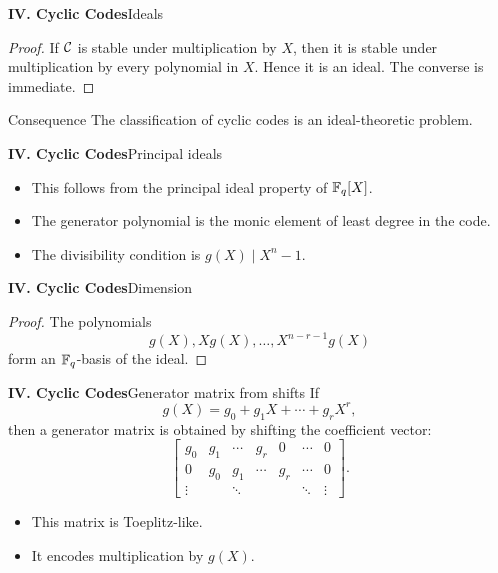 \begin{frame}{\textbf{IV. Cyclic Codes}}{Ideals}
\small
{}
\begin{proof}
If $\mathcal{C}$ is stable under multiplication by $X$, then it is stable under multiplication by every polynomial in $X$. Hence it is an ideal. The converse is immediate.
\end{proof}
\begin{block}{Consequence}
The classification of cyclic codes is an ideal-theoretic problem.
\end{block}
\end{frame}

\begin{frame}{\textbf{IV. Cyclic Codes}}{Principal ideals}
\small
{}
\begin{itemize}
  \item This follows from the principal ideal property of $\mathbb{F}_q[X]$.
  \item The generator polynomial is the monic element of least degree in the code.
  \item The divisibility condition is $g(X)\mid X^n-1$.
\end{itemize}
\end{frame}

\begin{frame}{\textbf{IV. Cyclic Codes}}{Dimension}
\small
{}
\begin{proof}
The polynomials
\[
  g(X),Xg(X),\ldots,X^{n-r-1}g(X)
\]
form an $\mathbb{F}_q$-basis of the ideal.
\end{proof}
\end{frame}

\begin{frame}{\textbf{IV. Cyclic Codes}}{Generator matrix from shifts}
\small
If
\[
  g(X)=g_0+g_1X+\cdots+g_rX^r,
\]
then a generator matrix is obtained by shifting the coefficient vector:
\[
\begin{bmatrix}
g_0&g_1&\cdots&g_r&0&\cdots&0\\
0&g_0&g_1&\cdots&g_r&\cdots&0\\
\vdots&&\ddots&&&\ddots&\vdots
\end{bmatrix}.
\]
\begin{itemize}
  \item This matrix is Toeplitz-like.
  \item It encodes multiplication by $g(X)$.
\end{itemize}
\end{frame}


